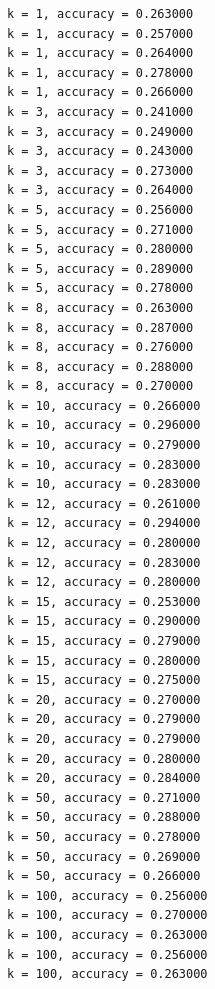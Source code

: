 \documentclass[11pt]{article}
\begin{document}
    \begin{Verbatim}[commandchars=\\\{\}]
k = 1, accuracy = 0.263000
k = 1, accuracy = 0.257000
k = 1, accuracy = 0.264000
k = 1, accuracy = 0.278000
k = 1, accuracy = 0.266000
k = 3, accuracy = 0.241000
k = 3, accuracy = 0.249000
k = 3, accuracy = 0.243000
k = 3, accuracy = 0.273000
k = 3, accuracy = 0.264000
k = 5, accuracy = 0.256000
k = 5, accuracy = 0.271000
k = 5, accuracy = 0.280000
k = 5, accuracy = 0.289000
k = 5, accuracy = 0.278000
k = 8, accuracy = 0.263000
k = 8, accuracy = 0.287000
k = 8, accuracy = 0.276000
k = 8, accuracy = 0.288000
k = 8, accuracy = 0.270000
k = 10, accuracy = 0.266000
k = 10, accuracy = 0.296000
k = 10, accuracy = 0.279000
k = 10, accuracy = 0.283000
k = 10, accuracy = 0.283000
k = 12, accuracy = 0.261000
k = 12, accuracy = 0.294000
k = 12, accuracy = 0.280000
k = 12, accuracy = 0.283000
k = 12, accuracy = 0.280000
k = 15, accuracy = 0.253000
k = 15, accuracy = 0.290000
k = 15, accuracy = 0.279000
k = 15, accuracy = 0.280000
k = 15, accuracy = 0.275000
k = 20, accuracy = 0.270000
k = 20, accuracy = 0.279000
k = 20, accuracy = 0.279000
k = 20, accuracy = 0.280000
k = 20, accuracy = 0.284000
k = 50, accuracy = 0.271000
k = 50, accuracy = 0.288000
k = 50, accuracy = 0.278000
k = 50, accuracy = 0.269000
k = 50, accuracy = 0.266000
k = 100, accuracy = 0.256000
k = 100, accuracy = 0.270000
k = 100, accuracy = 0.263000
k = 100, accuracy = 0.256000
k = 100, accuracy = 0.263000

    \end{Verbatim}
\end{document}
